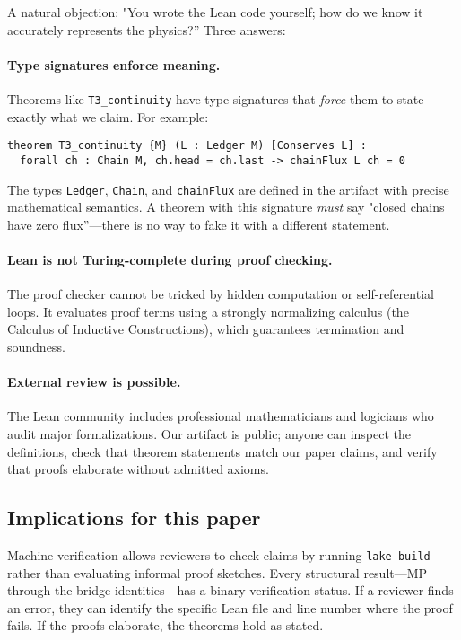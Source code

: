 \documentclass[11pt]{article}
\begin{document}
A natural objection: "You wrote the Lean code yourself; how do we know it accurately represents the physics?'' Three answers:

\paragraph{Type signatures enforce meaning.} Theorems like \texttt{T3\_continuity} have type signatures that \emph{force} them to state exactly what we claim. For example:
\begin{verbatim}
theorem T3_continuity {M} (L : Ledger M) [Conserves L] :
  forall ch : Chain M, ch.head = ch.last -> chainFlux L ch = 0
\end{verbatim}
The types \texttt{Ledger}, \texttt{Chain}, and \texttt{chainFlux} are defined in the artifact with precise mathematical semantics. A theorem with this signature \emph{must} say "closed chains have zero flux''—there is no way to fake it with a different statement.

\paragraph{Lean is not Turing-complete during proof checking.} The proof checker cannot be tricked by hidden computation or self-referential loops. It evaluates proof terms using a strongly normalizing calculus (the Calculus of Inductive Constructions), which guarantees termination and soundness.

\paragraph{External review is possible.} The Lean community includes professional mathematicians and logicians who audit major formalizations. Our artifact is public; anyone can inspect the definitions, check that theorem statements match our paper claims, and verify that proofs elaborate without admitted axioms.

\subsection{Implications for this paper}

Machine verification allows reviewers to check claims by running \texttt{lake build} rather than evaluating informal proof sketches. Every structural result—MP through the bridge identities—has a binary verification status. If a reviewer finds an error, they can identify the specific Lean file and line number where the proof fails. If the proofs elaborate, the theorems hold as stated.
\end{document}
